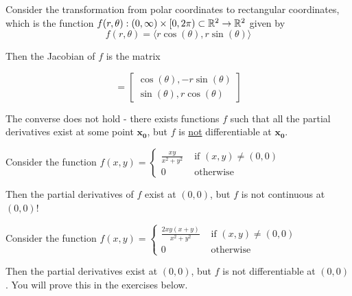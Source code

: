     \begin{example}
    Consider the transformation from polar coordinates to rectangular coordinates, which is the function $f(r,\theta) : (0, \infty) \times [0, 2\pi) \subset \mathbb{R}^2 \to \mathbb{R}^2$ given by $$f(r, \theta) = \langle r\cos(\theta), r\sin(\theta) \rangle$$

    Then the Jacobian of $f$ is the matrix

\begin{equation*}
        [J_f(r, \theta)] = \begin{bmatrix}
\cos(\theta), -r\sin(\theta) \\
\sin(\theta), r\cos(\theta)  
\end{bmatrix}
    \end{equation*}
    
    \end{example}
    
    
    \begin{remark}
    The converse does not hold - there exists functions $f$ such that all the partial derivatives exist at some point $\bm{x_0}$, but $f$ is \underline{not} differentiable at $\bm{x_0}$.
    \end{remark}    

\begin{example}
    Consider the function $f(x,y) = \left\{
		\begin{array}{ll}
			\frac{xy}{x^2 + y^2} & \text{ if } (x,y) \neq (0,0) \\
			0 & \text{ otherwise } 
		\end{array}
		\right.$

  Then the partial derivatives of $f$ exist at $(0,0)$, but $f$ is not continuous at $(0,0)$!
\end{example}


    \begin{example}
    Consider the function  $f(x,y) = \left\{
		\begin{array}{ll}
			\frac{2xy(x+y)}{x^2+y^2} & \text{ if } (x,y) \neq (0,0) \\
			0 & \text{ otherwise } 
		\end{array}
		\right.$

    Then the partial derivatives exist at $(0,0)$, but $f$ is not differentiable at $(0,0)$.  You will prove this in the exercises below.
\end{example}


